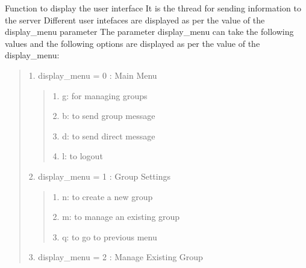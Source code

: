 \documentclass[letterpaper,10pt,english]{sphinxmanual}
\begin{document}
\begin{fulllineitems}
\label{\detokenize{client:client.user_interface}}
\sphinxAtStartPar
Function to display the user interface
It is the thread for sending information to the server
Different user intefaces are displayed as per the value of the display\_menu parameter
The parameter display\_menu can take the following values and the following options are displayed as per the value of the display\_menu:
\begin{quote}

\begin{DUlineblock}{0em}
\item[] 1. display\_menu = 0 : Main Menu
\end{DUlineblock}
\begin{quote}

\begin{DUlineblock}{0em}
\item[] 1. g: for managing groups
\item[] 2. b: to send group message
\item[] 3. d: to send direct message
\item[] 4. l: to logout
\end{DUlineblock}
\end{quote}

\begin{DUlineblock}{0em}
\item[] 2. display\_menu = 1 : Group Settings
\end{DUlineblock}
\begin{quote}

\begin{DUlineblock}{0em}
\item[] 1. n: to create a new group
\item[] 2. m: to manage an existing group
\item[] 3. q: to go to previous menu
\end{DUlineblock}
\end{quote}

\begin{DUlineblock}{0em}
\item[] 3. display\_menu = 2 : Manage Existing Group
\end{DUlineblock}
\begin{quote}


\end{quote}
\end{quote}
\end{fulllineitems}
\end{document}
